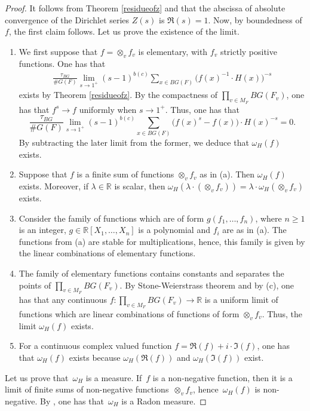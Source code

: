 \documentclass[a4paper,english,12pt]{amsart}
\newcommand{\RR}{\mathbb{R}}
\newcommand{\doots}{,\dots ,}
\newcommand{\vMF}{v\in M_F}
\def\no{n\textsuperscript{0}\,}
\numberwithin{equation}{subsection}
\begin{document}
\begin{proof}It follows from Theorem \ref{residueofz} and \cite[Section 2.3, Proposition~7]{coursdarithmetique} that the abscissa of absolute convergence of the Dirichlet series $Z(s)$ is $\Re(s)=1$.  Now, by boundedness of $f$, the first claim follows. Let us prove the existence of the limit.
\begin{enumerate}[label=(\alph*)]
\item We first suppose that $f=\otimes_v f_v$ is elementary, with $f_v$ strictly positive functions. %
One has that 
\begin{align*}
\frac{\tau_{BG} }{\# G(F)}\lim_{s\to 1^+}{(s-1)^{b(c)}}\sum_{x\in BG(F)} \big(f(x)^{-1}\cdot H(x)\big)^{-s}%
\end{align*}exists by Theorem \ref{residueofz}. By the compactness of $\prod_{\vMF}BG(F_v)$, one has that $f^{s}\to f$ uniformly when $s\to 1^+$. Thus, one has that $$\frac{\tau_{BG} }{\# G(F)}\lim_{s\to 1^+}{(s-1)^{b(c)}}\sum_{x\in BG(F)} \big(f(x)^{s}-f(x)\big)\cdot H(x)^{-s} =0.$$By subtracting the later limit from the former, we deduce that $\omega_H(f)$ exists. 
\item Suppose that $f$ is a finite sum of functions $\otimes_v f_v$ as in (a). Then $\omega_H(f)$ exists. Moreover, if $\lambda\in\RR$ is scalar, then $\omega_H(\lambda\cdot(\otimes_v f_v))=\lambda\cdot \omega_H(\otimes_v f_v)$ exists.
\item Consider the family of functions which are of form $g(f_1\doots f_n)$, where $n\geq 1$ is an integer, $g\in\RR[X_1\doots X_n]$ is a polynomial and $f_i$ are as in (a). The functions from (a) are stable for multiplications, hence, this family is given by the linear combinations of elementary functions. 
\item The family of elementary functions contains constants and separates the points of $\prod_{\vMF}BG(F_v)$. By Stone-Weierstrass theorem \cite[Chapter X, \S 4, \no 2, Theorem 3]{TopologieGd} and by (c), one has that any continuous $f:\prod_{\vMF}BG(F_v)\to\RR$ is a uniform limit of functions which are linear combinations of functions of form $\otimes_v f_v$. Thus, the limit $\omega_H(f)$ exists. 
\item For a continuous complex valued function $f=\Re(f)+i\cdot\Im(f)$, one has that $\omega_H(f)$ exists because $\omega_H(\Re(f))$ and $\omega_H(\Im(f))$ exist. \end{enumerate}
Let us prove that~$\omega_H$ is a measure. If~$f$ is a non-negative function, then it is a limit of finite sums of non-negative functions~$\otimes_v f_v$, hence~$\omega_H(f)$ is non-negative. By \cite[Chapter III, \S 1, \no 6, Theorem 1]{Integrationj}, one has that~$\omega_H$ is a Radon measure. 
\end{proof}
\end{document}
